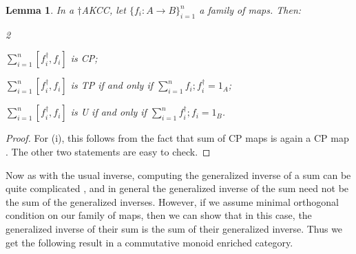 \documentclass[submission,copyright,creativecommons]{eptcs}
\newtheorem{lemma}[observation]{Lemma}  %
\begin{document}
\begin{lemma} In a $\dagger$AKCC, let $\lbrace f_i: A \to B \rbrace^n_{i=1}$ a family of maps. Then: 
\vspace{-0.3cm}
   \begin{enumerate}[(i)]
    \begin{multicols}{2}
\item $\sum\limits_{i=1}^n [f_i^\dagger,f_i]$ is CP;
\item $\sum\limits_{i=1}^n [f_i^\dagger,f_i]$ is TP if and only if $\sum\limits_{i=1}^n f_i;f_i^\dagger = 1_A$;
\columnbreak
\item $\sum\limits_{i=1}^n [f_i^\dagger,f_i]$ is U if and only if $\sum\limits_{i=1}^n f_i^\dagger;f_i = 1_B$. 
\end{multicols}
\end{enumerate}
\vspace{-0.3cm}
\end{lemma}
\begin{proof} For (i), this follows from the fact that sum of CP maps is again a CP map \cite[Lem 5.2]{selinger2007dagger}. The other two statements are easy to check.  
\end{proof}

Now as with the usual inverse, computing the generalized inverse of a sum can be quite complicated \cite{cline1965representations}, and in general the generalized inverse of the sum need not be the sum of the generalized inverses. However, if we assume minimal orthogonal condition on our family of maps, then we can show that in this case, the generalized inverse of their sum is the sum of their generalized inverse. Thus we get the following result in a commutative monoid enriched category. 
\end{document}
